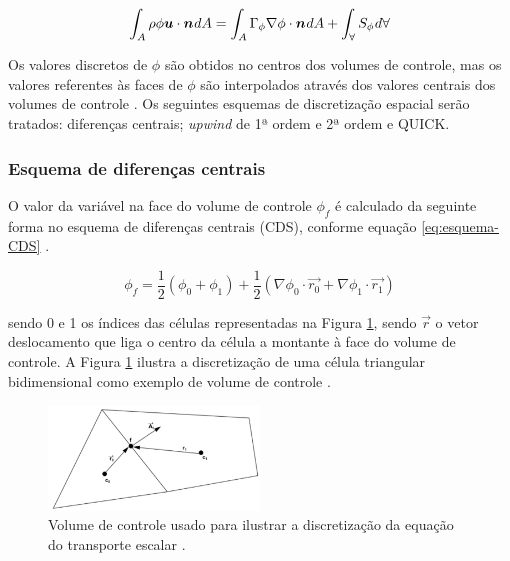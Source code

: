 \begin{equation}
    \label{eq:volumes-finitos-estacionaria}
    \int_{A} \rho\phi\boldsymbol{u}\cdot\boldsymbol{n}\hspace{0.5pt} dA = \int_{A} \Gamma_{\phi}\nabla\phi\cdot\boldsymbol{n}\hspace{0.5pt} dA + \int_{\forall} S_{\phi}\hspace{0.5pt} d\forall
\end{equation}

Os valores discretos de $\phi$ são obtidos no centros dos volumes de controle, mas os valores referentes às faces de $\phi$ são interpolados através dos valores centrais dos volumes de controle \cite{Rezende2009}. Os seguintes esquemas de discretização espacial serão tratados: diferenças centrais; \textit{upwind} de 1ª ordem e 2ª ordem e QUICK.

\subsubsection{Esquema de diferenças centrais}

O valor da variável na face do volume de controle $\phi_{f}$ é calculado da seguinte forma no esquema de diferenças centrais (CDS), conforme equação \ref{eq:esquema-CDS} \cite{Rezende2009}.

\begin{equation}
    \label{eq:esquema-CDS}
    \phi_f = \frac{1}{2}\left(\phi_0+\phi_1\right)+\frac{1}{2}\left(\nabla\phi_0\cdot\overrightarrow{r_0}+\nabla\phi_1\cdot\overrightarrow{r_1}\right)
\end{equation}

sendo 0 e 1 os índices das células representadas na Figura \ref{fig:volume-ANSYS-2021R2}, sendo $\overrightarrow{r}$ o vetor deslocamento que liga o centro da célula a montante à face do volume de controle. A Figura \ref{fig:volume-ANSYS-2021R2} ilustra a discretização de uma célula triangular bidimensional como exemplo de volume de controle \cite{fluent2021ansys}.

\begin{figure}[!ht] 
	\centering
	\includegraphics[width=0.5\textwidth]{foto01-volume-fluent.png}
    \caption[Volume de controle usado para ilustrar a discretização da equação do transporte escalar.]{Volume de controle usado para ilustrar a discretização da equação do transporte escalar \cite{fluent2021ansys}.}
	\label{fig:volume-ANSYS-2021R2}
\end{figure}

